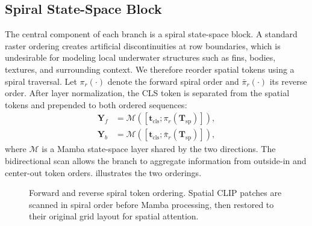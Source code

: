 \subsection{Spiral State-Space Block}

The central component of each branch is a spiral state-space block. A standard raster ordering creates artificial discontinuities at row boundaries, which is undesirable for modeling local underwater structures such as fins, bodies, textures, and surrounding context. We therefore reorder spatial tokens using a spiral traversal. Let $\pi_r(\cdot)$ denote the forward spiral order and $\bar{\pi}_r(\cdot)$ its reverse order. After layer normalization, the CLS token is separated from the spatial tokens and prepended to both ordered sequences:
\begin{align}
  \mathbf{Y}_{f}
  &=
  \mathcal{M}
  \left(
    [\mathbf{t}_{\mathrm{cls}}; \pi_r(\mathbf{T}_{\mathrm{sp}})]
  \right),
  \nonumber \\
  \mathbf{Y}_{b}
  &=
  \mathcal{M}
  \left(
    [\mathbf{t}_{\mathrm{cls}}; \bar{\pi}_r(\mathbf{T}_{\mathrm{sp}})]
  \right),
  \label{eq:spiral-mamba}
\end{align}
where $\mathcal{M}$ is a Mamba state-space layer shared by the two directions. The bidirectional scan allows the branch to aggregate information from outside-in and center-out token orders.  illustrates the two orderings.

\begin{figure}[tb]
  \centering
  \caption{Forward and reverse spiral token ordering. Spatial CLIP patches are scanned in spiral order before Mamba processing, then restored to their original grid layout for spatial attention.}
  \label{fig:spiral-scan}
\end{figure}

